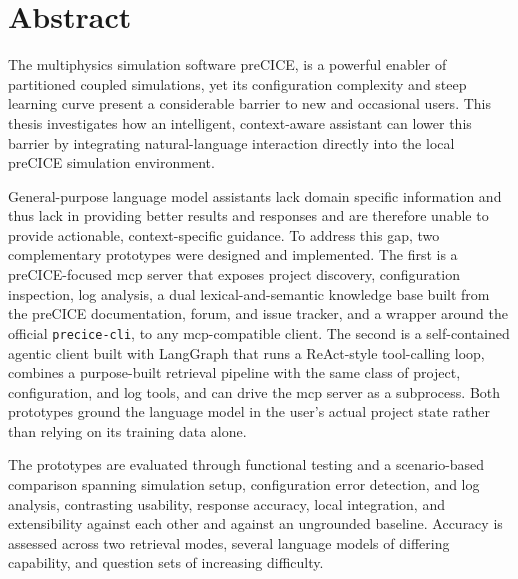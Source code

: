 \documentclass[
  numbers=noenddot,
  english,
  a4paper,
  twoside,
  bibliography=totoc,
  headsepline,
  cleardoublepage=empty,
  parskip=half,
  draft=false
]{scrbook}
\theoremstyle{break}
\renewcommand{\_}{\textunderscore\allowbreak}
\begin{document}

\raggedbottom
{}
\Titelblatt

\pagestyle{plain.scrheadings}
\renewcommand*{\chapterpagestyle}{plain.scrheadings}

\section*{Abstract}

The multiphysics simulation software preCICE, is a powerful enabler of partitioned coupled
simulations, yet its configuration complexity and steep learning curve present a considerable
barrier to new and occasional users.
This thesis investigates how an intelligent, context-aware assistant can lower this barrier by
integrating natural-language interaction directly into the local preCICE simulation environment.

General-purpose language model assistants lack domain specific information and thus lack in providing better results 
and responses and are therefore unable to provide actionable, context-specific guidance.
To address this gap, two complementary prototypes were designed and implemented.
The first is a preCICE-focused \gls{mcp} server that exposes project discovery, configuration
inspection, log analysis, a dual lexical-and-semantic knowledge base built from the preCICE
documentation, forum, and issue tracker, and a wrapper around the official \texttt{precice-cli},
to any \gls{mcp}-compatible client.
The second is a self-contained agentic client built with LangGraph that runs a ReAct-style
tool-calling loop, combines a purpose-built retrieval pipeline with the same class of project,
configuration, and log tools, and can drive the \gls{mcp} server as a subprocess.
Both prototypes ground the language model in the user's actual project state rather than
relying on its training data alone.

The prototypes are evaluated through functional testing and a scenario-based comparison
spanning simulation setup, configuration error detection, and log analysis, contrasting
usability, response accuracy, local integration, and extensibility against each other and
against an ungrounded baseline.
Accuracy is assessed across two retrieval modes, several language models of differing
capability, and question sets of increasing difficulty.
\end{document}
